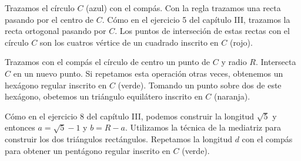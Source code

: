Trazamos el círculo $C$ (azul) con el compás. Con la regla trazamos una recta
pasando por el centro de $C$. Cómo en el ejercicio 5 del capítulo III,
trazamos la recta ortogonal pasando por $C$. Los puntos de interseción de estas
rectas con el círculo $C$ son los cuatros vértice de un cuadrado inscrito en
$C$ (rojo). 

Trazamos con el compás el círculo de centro un punto de $C$ y radio $R$.
Intersecta $C$ en un nuevo punto. Si repetamos esta operación otras veces,
obtenemos un hexágono regular inscrito en $C$ (verde). Tomando un punto sobre
dos de este hexágono, obetemos un triángulo equilátero inscrito en $C$
(naranja).

\begin{center}
\end{center}

Cómo en el ejercicio 8 del capítulo III, podemos construir la longitud
$\sqrt{5}$ y
entonces $a = \sqrt{5} - 1$ y $b = R - a$. Utilizamos la técnica de la mediatriz
para construir los dos triángulos rectángulos. Repetamos la longitud $d$ con
el compás para obtener un pentágono regular inscrito en $C$ (verde).

